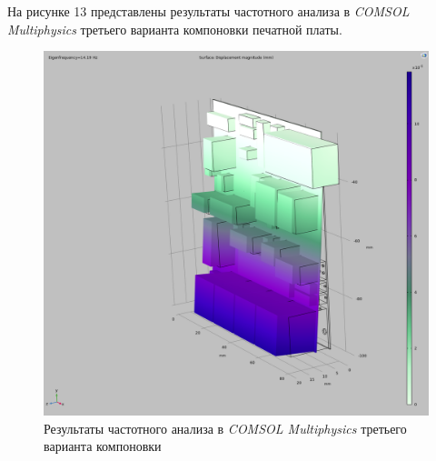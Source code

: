На рисунке 13 представлены результаты частотного анализа в \textit{COMSOL Multiphysics} третьего варианта компоновки печатной платы.

\begin{figure}[h]
  \centering
  \includegraphics[scale=0.3]{../img/sst-3/freq/comsol.png}
  \caption{Результаты частотного анализа в \textit{COMSOL Multiphysics}
    третьего варианта компоновки}
\end{figure}
